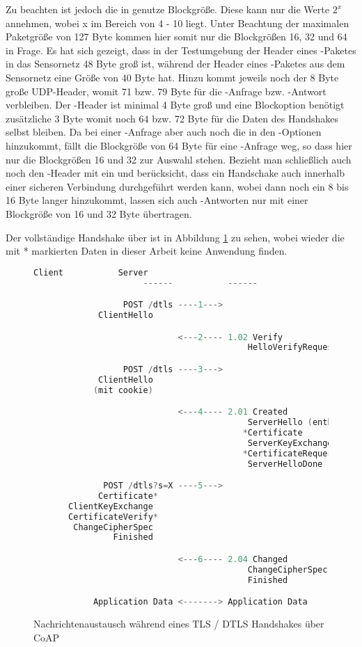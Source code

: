 Zu beachten ist jedoch die in  genutze Blockgröße. Diese kann nur die Werte $ 2^x $ annehmen, wobei x im Bereich von 4 - 10 liegt.
Unter Beachtung der maximalen Paketgröße von 127 Byte kommen hier somit nur die Blockgrößen 16, 32 und 64 in Frage. Es hat sich gezeigt,
dass in der Testumgebung der Header eines -Paketes in das Sensornetz 48 Byte groß ist, während der Header eines -Paketes
aus dem Sensornetz eine Größe von 40 Byte hat. Hinzu kommt jeweils noch der 8 Byte große UDP-Header, womit 71 bzw. 79 Byte für die -Anfrage bzw.
-Antwort verbleiben. Der -Header ist minimal 4 Byte groß und eine Blockoption benötigt zusätzliche 3 Byte womit noch 64 bzw. 72 Byte
für die Daten des Handshakes selbst bleiben. Da bei einer -Anfrage aber auch noch die  in den -Optionen hinzukommt,
fällt die Blockgröße von 64 Byte für eine -Anfrage weg, so dass hier nur die Blockgrößen 16 und 32 zur Auswahl stehen. Bezieht man schließlich
auch noch den -Header mit ein und berücksicht, dass ein Handschake auch innerhalb einer sicheren Verbindung durchgeführt werden kann, wobei
dann noch ein 8 bis 16 Byte langer  hinzukommt, lassen sich auch -Antworten nur mit einer Blockgröße von 16 und 32 Byte übertragen.

Der vollständige Handshake über  ist in Abbildung \ref{fig:coaphandshake} zu sehen, wobei wieder die mit * markierten Daten
in dieser Arbeit keine Anwendung finden.

\begin{figure}[ht]
  \centering
  \begin{lstlisting}[language=c]
                      Client           Server
                      ------           ------

                  POST /dtls ----1--->
             ClientHello

                             <---2---- 1.02 Verify
                                           HelloVerifyRequest

                  POST /dtls ----3--->
             ClientHello
            (mit cookie)

                             <---4---- 2.01 Created
                                           ServerHello (enthält Session X)
                                          *Certificate
                                           ServerKeyExchange
                                          *CertificateRequest
                                           ServerHelloDone

              POST /dtls?s=X ----5--->
             Certificate*
       ClientKeyExchange
       CertificateVerify*
        ChangeCipherSpec
                Finished

                             <---6---- 2.04 Changed
                                           ChangeCipherSpec
                                           Finished

            Application Data <-------> Application Data
  \end{lstlisting}
  \caption{Nachrichtenaustausch während eines TLS / DTLS Handshakes über CoAP}
  \label{fig:coaphandshake}
\end{figure}

